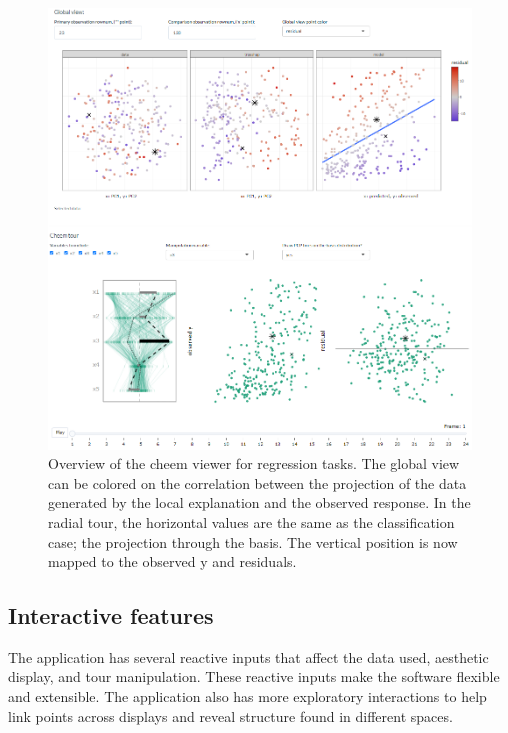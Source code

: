 \documentclass[
]{article}
\begin{document}
\begin{figure}

{\centering \includegraphics[width=1\linewidth]{./figures/app_regression} 

}

\caption{Overview of the cheem viewer for regression tasks. The global view can be colored on the correlation between the projection of the data generated by the local explanation and the observed response. In the radial tour, the horizontal values are the same as the classification case; the projection through the basis. The vertical position is now mapped to the observed y and residuals.}\label{fig:regressioncase}
\end{figure}

\hypertarget{interactive-features}{%
\subsection{Interactive features}\label{interactive-features}}

The application has several reactive inputs that affect the data used, aesthetic display, and tour manipulation. These reactive inputs make the software flexible and extensible. The application also has more exploratory interactions to help link points across displays and reveal structure found in different spaces.
\end{document}
